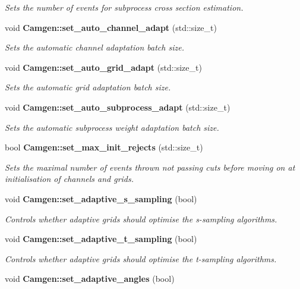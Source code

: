 \begin{DoxyCompactItemize}
\begin{DoxyCompactList}\small\item\em Sets the number of events for subprocess cross section estimation. \end{DoxyCompactList}\item 
void {\bfseries Camgen\+::set\+\_\+auto\+\_\+channel\+\_\+adapt} (std\+::size\+\_\+t)
\begin{DoxyCompactList}\small\item\em Sets the automatic channel adaptation batch size. \end{DoxyCompactList}\item 
void {\bfseries Camgen\+::set\+\_\+auto\+\_\+grid\+\_\+adapt} (std\+::size\+\_\+t)
\begin{DoxyCompactList}\small\item\em Sets the automatic grid adaptation batch size. \end{DoxyCompactList}\item 
void {\bfseries Camgen\+::set\+\_\+auto\+\_\+subprocess\+\_\+adapt} (std\+::size\+\_\+t)
\begin{DoxyCompactList}\small\item\em Sets the automatic subprocess weight adaptation batch size. \end{DoxyCompactList}\item 
bool {\bfseries Camgen\+::set\+\_\+max\+\_\+init\+\_\+rejects} (std\+::size\+\_\+t)
\begin{DoxyCompactList}\small\item\em Sets the maximal number of events thrown not passing cuts before moving on at initialisation of channels and grids. \end{DoxyCompactList}\item 
void {\bfseries Camgen\+::set\+\_\+adaptive\+\_\+s\+\_\+sampling} (bool)
\begin{DoxyCompactList}\small\item\em Controls whether adaptive grids should optimise the s-\/sampling algorithms. \end{DoxyCompactList}\item 
void {\bfseries Camgen\+::set\+\_\+adaptive\+\_\+t\+\_\+sampling} (bool)
\begin{DoxyCompactList}\small\item\em Controls whether adaptive grids should optimise the t-\/sampling algorithms. \end{DoxyCompactList}\item 
void {\bfseries Camgen\+::set\+\_\+adaptive\+\_\+angles} (bool)

\end{DoxyCompactItemize}
